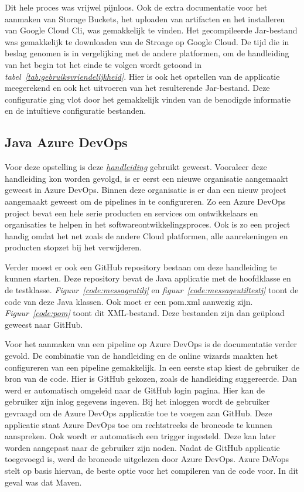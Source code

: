 Dit hele proces was vrijwel pijnloos. Ook de extra documentatie voor het aanmaken van Storage Buckets, het uploaden van artifacten en het installeren van Google Cloud Cli, was gemakkelijk te vinden. Het gecompileerde Jar-bestand was gemakkelijk te downloaden van de Stroage op Google Cloud. De tijd die in beslag genomen is in vergelijking met de andere platformen, om de handleiding van het begin tot het einde te volgen wordt getoond in \emph{tabel~\ref{tab:gebruiksvriendelijkheid}}. Hier is ook het opstellen van de applicatie meegerekend en ook het uitvoeren van het resulterende Jar-bestand. Deze configuratie ging vlot door het gemakkelijk vinden van de benodigde informatie en de intuïtieve configuratie bestanden.

\subsection{Java Azure DevOps}
\label{sec:JAD}
Voor deze opstelling is deze \emph{\href{https://docs.microsoft.com/en-us/azure/devops/pipelines/ecosystems/java?view=azure-devops}{handleiding}} gebruikt geweest. Vooraleer deze handleiding kon worden gevolgd, is er eerst een nieuwe organisatie aangemaakt geweest in Azure DevOps. Binnen deze organisatie is er dan een nieuw project aangemaakt geweest om de pipelines in te configureren. Zo een Azure DevOps project bevat een hele serie producten en services om ontwikkelaars en organisaties te helpen in het softwareontwikkelingsproces. Ook is zo een project handig omdat het net zoals de andere Cloud platformen, alle aanrekeningen en producten stopzet bij het verwijderen.

Verder moest er ook een GitHub repository bestaan om deze handleiding te kunnen starten. Deze repository bevat de Java applicatie met de hoofdklasse en de testklasse. \emph{Figuur~\ref{code:messageutilj}} en \emph{figuur~\ref{code:messageutiltestj}} toont de code van deze Java klassen. Ook moet er een pom.xml aanwezig zijn. \emph{Figuur~\ref{code:pom}} toont dit XML-bestand. Deze bestanden zijn dan geüpload geweest naar GitHub. 

Voor het aanmaken van een pipeline op Azure DevOps is de documentatie verder gevold. De combinatie van de handleiding en de online wizards maakten het configureren van een pipeline gemakkelijk. In een eerste stap kiest de gebruiker de bron van de code. Hier is GitHub gekozen, zoals de handleiding suggereerde. Dan werd er automatisch omgeleid naar de GitHub login pagina. Hier kan de gebruiker zijn inlog gegevens ingeven. Bij het inloggen wordt de gebruiker gevraagd om de Azure DevOps applicatie toe te voegen aan GitHub. Deze applicatie staat Azure DevOps toe om rechtstreeks de broncode te kunnen aanspreken. Ook wordt er automatisch een trigger ingesteld. Deze kan later worden aangepast naar de gebruiker zijn noden. Nadat de GitHub applicatie toegevoegd is, werd de broncode uitgelezen door Azure DevOps. Azure DeVops stelt op basis hiervan, de beste optie voor het compileren van de code voor. In dit geval was dat Maven.


